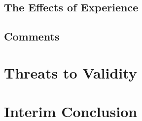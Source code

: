 \documentclass[../thesis]{subfiles}
\begin{document}
%
%

%


\subsection{The Effects of Experience}\label{subsec:experience}
\fxfatal{}

\subsection{Comments}
\fxfatal{}

\section{Threats to Validity}\label{sec:threats}
\fxfatal{}

\section{Interim Conclusion}  %
\fxfatal{}
\end{document}
